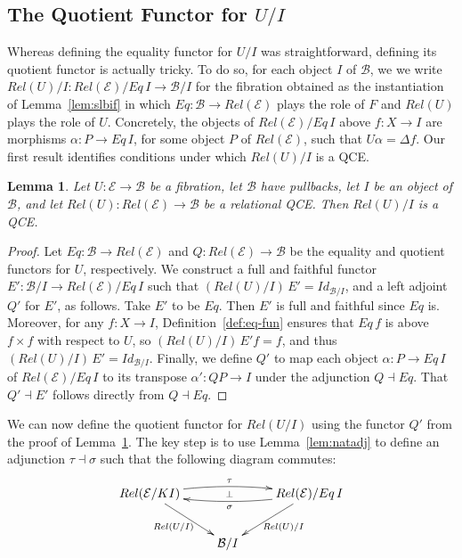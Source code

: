 \documentclass{LMCS}
\newcommand{\ra}{\rightarrow}
\newcommand\E{{\mathcal E}}
\newcommand\B{{\mathcal B}}
\theoremstyle{plain}
\newtheorem{lemma}[theorem]{Lemma}
\theoremstyle{remark}
\theoremstyle{definition}
\begin{document}
\subsection{The Quotient Functor for $U/I$}

Whereas defining the equality functor for $U/I$ was straightforward,
defining its quotient functor is actually tricky.  To do so, for each
object $I$ of $\B$, we we write $Rel(U)/I : Rel(\E)/Eq\, I \ra \B/I$
for the fibration obtained as the instantiation of
Lemma~\ref{lem:slbif} in which $Eq : \B \to Rel(\E)$ plays the role of
$F$ and $Rel(U)$ plays the role of $U$. Concretely, the objects of
$Rel(\E)/Eq \, I$ above $f:X \ra I$ are morphisms $\alpha:P \ra Eq\,
I$, for some object $P$ of $Rel(\E)$, such that $U \alpha = \Delta
f$. Our first result identifies conditions under which $Rel(U)/I$ is a
QCE.

\begin{lemma}\label{lem:lift-qce}
  Let $U : \E \to \B$ be a fibration, let $\B$ have pullbacks, let $I$
  be an object of $\B$, and let $Rel(U):Rel(\E) \ra \B$ be a
  relational QCE. Then $Rel(U)/I$ is a QCE.
\end{lemma}
\begin{proof}
  Let $Eq :\B \to Rel(\E)$ and $Q : Rel(\E) \to \B$ be the equality
  and quotient functors for $U$, respectively. We construct a full and
  faithful functor $E':\B/I \ra Rel(\E)/Eq \,I$ such that $(Rel(U)/I)
  \, E' = \mathit{Id}_{\B/I}$, and a left adjoint $Q'$ for $E'$, as
  follows. Take $E'$ to be $Eq$. Then $E'$ is full and faithful since
  $Eq$ is. Moreover, for any $f : X \to I$,
  Definition~\ref{def:eq-fun} ensures that $Eq\,f$ is above $f \times
  f$ with respect to $U$, so $(Rel(U)/I)\, E' f = f$, and thus
  $(Rel(U)/I) \, E' = Id_{\B/I}$. Finally, we define $Q'$ to map each
  object $\alpha : P \ra Eq \,I$ of $Rel(\E)/Eq\, I$ to its transpose
  $\alpha': QP \ra I$ under the adjunction $Q \dashv Eq$. That $Q'
  \dashv E'$ follows directly from $Q \dashv Eq$.
\end{proof}

We can now define the quotient functor for $Rel(U/I)$ using the
functor $Q'$ from the proof of Lemma~\ref{lem:lift-qce}. The key step
is to use Lemma~\ref{lem:natadj} to define an adjunction $\tau \dashv
\sigma$ such that the following diagram commutes:
\[\xymatrix{{Rel(\E/KI)}\ar[dr]_{Rel(U/I)} \ar@/^/[rr]^\tau
  \ar@{}[rr]|\bot & & 
   \ar@/^/[ll]^\sigma \ar[ld]^{Rel(U)/I} {Rel(\E)/Eq\, I}\\ & {\B/I} &
}\] 
\end{document}
